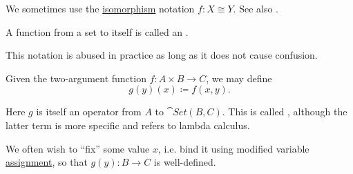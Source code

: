 \begin{definition}
\begin{thmenum}
    We sometimes use the \hyperref[def:morphism_invertibility/isomorphism]{isomorphism} notation \( f: X \cong Y \). See also .
  \end{thmenum}
\end{definition}

\begin{definition}\label{def:endofunction}
  A function from a set to itself is called an .
\end{definition}

\begin{definition}\label{def:currying}
  This notation is abused in practice as long as it does not cause confusion.

  Given the two-argument function \( f: A \times B \to C \), we may define
  \begin{equation*}
    g(y)(x) \coloneqq f(x, y).
  \end{equation*}

  Here \( g \) is itself an operator from \( A \) to \( \cat{Set}(B, C) \). This is called , although the latter term is more specific and refers to lambda calculus.

  We often wish to \enquote{fix} some value \( x \), i.e. bind it using modified variable \hyperref[def:first_order_valuation/variable_assignment]{assignment}, so that \( g(y): B \to C \) is well-defined.
\end{definition}

